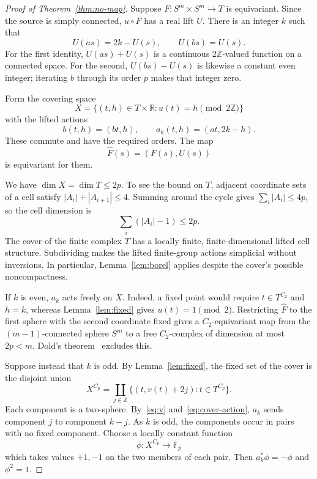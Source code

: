 \documentclass[11pt]{amsart}
\theoremstyle{remark}
\numberwithin{equation}{section}
\newcommand{\R}{\mathbb R}
\newcommand{\Z}{\mathbb Z}
\newcommand{\F}{\mathbb F}
\begin{document}
\begin{proof}[Proof of Theorem~\ref{thm:no-map}]
Suppose $F:S^m\times S^m\to T$ is equivariant. Since the source is simply connected, $u\circ F$ has a real lift $U$. There is an integer $k$ such that
\begin{equation}\label{eq:source-lifts}
 U(as)=2k-U(s),\qquad U(bs)=U(s).
\end{equation}
For the first identity, $U(as)+U(s)$ is a continuous $2\Z$-valued function on a connected space. For the second, $U(bs)-U(s)$ is likewise a constant even integer; iterating $b$ through its order $p$ makes that integer zero.

Form the covering space
\[
 X=\{(t,h)\in T\times\R:u(t)=h\pmod{2\Z}\}
\]
with the lifted actions
\begin{equation}\label{eq:cover-action}
 b(t,h)=(bt,h),\qquad a_k(t,h)=(at,2k-h).
\end{equation}
These commute and have the required orders. The map
\[
 \widehat F(s)=(F(s),U(s))
\]
is equivariant for them.

We have $\dim X=\dim T\leq2p$. To see the bound on $T$, adjacent coordinate sets of a cell satisfy $|A_i|+|A_{i+1}|\leq4$. Summing around the cycle gives $\sum_i|A_i|\leq4p$, so the cell dimension is
\[
 \sum_i(|A_i|-1)\leq2p.
\]
The cover of the finite complex $T$ has a locally finite, finite-dimensional lifted cell structure. Subdividing makes the lifted finite-group actions simplicial without inversions. In particular, Lemma~\ref{lem:borel} applies despite the cover's possible noncompactness.

If $k$ is even, $a_k$ acts freely on $X$. Indeed, a fixed point would require $t\in T^{C_2}$ and $h=k$, whereas Lemma~\ref{lem:fixed} gives $u(t)=1\pmod2$. Restricting $\widehat F$ to the first sphere with the second coordinate fixed gives a $C_2$-equivariant map from the $(m-1)$-connected sphere $S^m$ to a free $C_2$-complex of dimension at most $2p<m$. Dold's theorem~\cite{Dold} excludes this.

Suppose instead that $k$ is odd. By Lemma~\ref{lem:fixed}, the fixed set of the cover is the disjoint union
\begin{equation}\label{eq:fixed-sheets}
 X^{C_p}=\coprod_{j\in\Z}
 \{(t,v(t)+2j):t\in T^{C_p}\}.
\end{equation}
Each component is a two-sphere. By~\eqref{eq:v} and~\eqref{eq:cover-action}, $a_k$ sends component $j$ to component $k-j$. As $k$ is odd, the components occur in pairs with no fixed component. Choose a locally constant function
\[
 \phi:X^{C_p}\longrightarrow\F_p
\]
which takes values $+1,-1$ on the two members of each pair. Then $a_k^*\phi=-\phi$ and $\phi^2=1$.


\end{proof}
\end{document}
